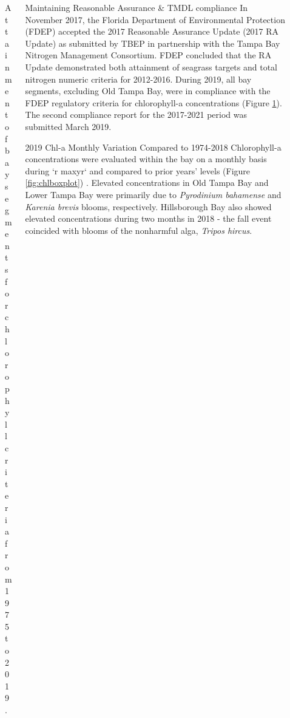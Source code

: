 \documentclass[final,t]{beamer}\usepackage[]{graphicx}\usepackage[]{color}
\begin{document}
\begin{frame}
\begin{columns}[t]
\begin{column}{.32\linewidth}
\begin{figure}
\caption{\footnotesize Attainment of bay segments for chlorophyll criteria from 1975 to 2019.}
\label{fig:chlmat}
\end{figure}

\end{column}

\begin{column}{.63\linewidth}

\begin{block}{Maintaining Reasonable Assurance \& TMDL compliance}
\footnotesize
In November 2017, the Florida Department of Environmental Protection (FDEP) accepted the 2017 Reasonable Assurance Update (2017 RA Update) as submitted by TBEP in partnership with the Tampa Bay Nitrogen Management Consortium. FDEP concluded that the RA Update demonstrated both attainment of seagrass targets and total nitrogen numeric criteria for 2012-2016. During 2019, all bay segments, excluding Old Tampa Bay, were in compliance with the FDEP regulatory criteria for chlorophyll-a concentrations (Figure \ref{fig:chlmat}). The second compliance report for the 2017-2021 period was submitted March 2019. 
\end{block}

\begin{block}{2019 Chl-a Monthly Variation Compared to 1974-2018}
\footnotesize
Chlorophyll-a concentrations were evaluated within the bay on a monthly basis during `r maxyr` and compared to prior years' levels (Figure \ref{fig:chlboxplot}) . Elevated concentrations in Old Tampa Bay and Lower Tampa Bay were primarily due to \textit{Pyrodinium bahamense} and \textit{Karenia brevis} blooms, respectively. Hillsborough Bay also showed elevated concentrations during two months in 2018 - the fall event coincided with blooms of the nonharmful alga, \textit{Tripos hircus}.
\end{block}



\vspace{-0.1in}


\end{column}
\end{columns}
\end{frame}
\end{document}
